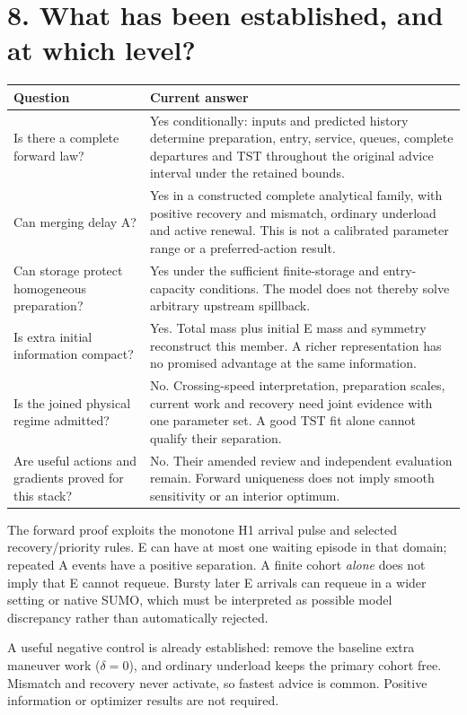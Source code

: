 \documentclass[11pt,a4paper]{article}
\begin{document}
\section*{8. What has been established, and at which level?}
\begin{tabular}{>{\raggedright\arraybackslash}p{43mm}>{\raggedright\arraybackslash}p{107mm}}
\toprule
Question & Current answer\\
\midrule
Is there a complete forward law? & Yes conditionally: inputs and predicted
history determine preparation, entry, service, queues, complete departures
and TST throughout the original advice interval under the retained bounds.\\[6pt]
Can merging delay A? & Yes in a constructed complete analytical family,
with positive recovery and mismatch, ordinary underload and active renewal.
This is not a calibrated parameter range or a preferred-action result.\\[6pt]
Can storage protect homogeneous preparation? & Yes under the sufficient
finite-storage and entry-capacity conditions. The model does not thereby
solve arbitrary upstream spillback.\\[6pt]
Is extra initial information compact? & Yes. Total mass plus initial E mass
and symmetry reconstruct this member. A richer representation has no
promised advantage at the same information.\\[6pt]
Is the joined physical regime admitted? & No. Crossing-speed interpretation,
preparation scales, current work and recovery need joint evidence with one
parameter set. A good TST fit alone cannot qualify their separation.\\[6pt]
Are useful actions and gradients proved for this stack? & No. Their amended
review and independent evaluation remain. Forward uniqueness does not imply
smooth sensitivity or an interior optimum.\\
\bottomrule
\end{tabular}

The forward proof exploits the monotone H1 arrival pulse and selected
recovery/priority rules. E can have at most one waiting episode in that
domain; repeated A events have a positive separation. A finite cohort
\emph{alone} does not imply that E cannot requeue. Bursty later E arrivals
can requeue in a wider setting or native SUMO, which must be interpreted
as possible model discrepancy rather than automatically rejected.

A useful negative control is already established: remove the baseline
extra maneuver work ($\delta=0$), and ordinary underload keeps the primary
cohort free. Mismatch and recovery never activate, so fastest advice is
common. Positive information or optimizer results are not required.
\end{document}
